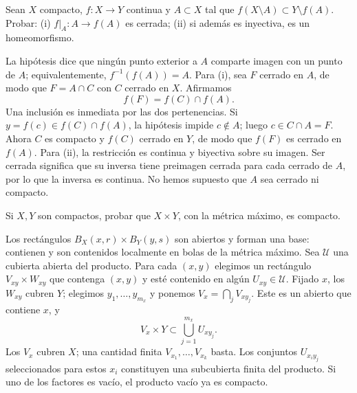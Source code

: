 \begin{ejercicio}
Sean $X$ compacto, $f:X\to Y$ continua y $A\subset X$ tal que $f(X\setminus A)\subset Y\setminus f(A)$. Probar: (i) $f|_A:A\to f(A)$ es cerrada; (ii) si además es inyectiva, es un homeomorfismo.
\end{ejercicio}
\begin{solucion}
La hipótesis dice que ningún punto exterior a $A$ comparte imagen con un punto de $A$; equivalentemente, $f^{-1}(f(A))=A$. Para (i), sea $F$ cerrado en $A$, de modo que $F=A\cap C$ con $C$ cerrado en $X$. Afirmamos
\[
f(F)=f(C)\cap f(A).
\]
Una inclusión es inmediata por las dos pertenencias. Si $y=f(c)\in f(C)\cap f(A)$, la hipótesis impide $c\notin A$; luego $c\in C\cap A=F$. Ahora $C$ es compacto y $f(C)$ cerrado en $Y$, de modo que $f(F)$ es cerrado en $f(A)$. Para (ii), la restricción es continua y biyectiva sobre su imagen. Ser cerrada significa que su inversa tiene preimagen cerrada para cada cerrado de $A$, por lo que la inversa es continua. No hemos supuesto que $A$ sea cerrado ni compacto.
\end{solucion}

\begin{ejercicio}
Si $X,Y$ son compactos, probar que $X\times Y$, con la métrica máximo, es compacto.
\end{ejercicio}
\begin{solucion}
Los rectángulos $B_X(x,r)\times B_Y(y,s)$ son abiertos y forman una base: contienen y son contenidos localmente en bolas de la métrica máximo. Sea $\mathcal U$ una cubierta abierta del producto. Para cada $(x,y)$ elegimos un rectángulo $V_{xy}\times W_{xy}$ que contenga $(x,y)$ y esté contenido en algún $U_{xy}\in\mathcal U$. Fijado $x$, los $W_{xy}$ cubren $Y$; elegimos $y_1,\ldots,y_{m_x}$ y ponemos $V_x=\bigcap_jV_{xy_j}$. Este es un abierto que contiene $x$, y
\[
V_x\times Y\subset\bigcup_{j=1}^{m_x}U_{xy_j}.
\]
Los $V_x$ cubren $X$; una cantidad finita $V_{x_1},\ldots,V_{x_k}$ basta. Los conjuntos $U_{x_i y_j}$ seleccionados para estos $x_i$ constituyen una subcubierta finita del producto. Si uno de los factores es vacío, el producto vacío ya es compacto.
\end{solucion}

